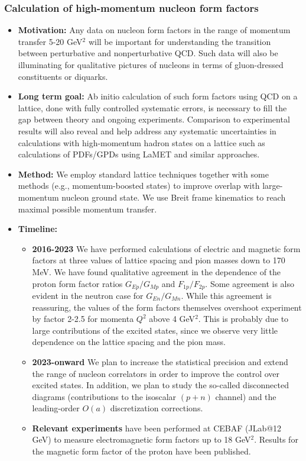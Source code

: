 \documentclass[12pt,hyperpdf]{article}
\begin{document}
\subsubsection{Calculation of high-momentum nucleon form factors}
\begin{itemize}
    \item{\bf Motivation:} Any data on nucleon form factors in the range of momentum transfer 5-20 GeV$^2$ will be important for understanding the transition between perturbative and nonperturbative QCD. Such data will also be illuminating for qualitative pictures of nucleons in terms of gluon-dressed constituents or diquarks.
    \item{\bf Long term goal:} Ab initio calculation of such form factors using QCD on a lattice, done with fully controlled systematic errors, is necessary to fill the gap between theory and ongoing experiments. Comparison to experimental results will also reveal and help address any systematic uncertainties in calculations with high-momentum hadron states on a lattice such as calculations of PDFs/GPDs using LaMET and similar approaches.
    \item{\bf Method:} We employ standard lattice techniques together with some methods (e.g., momentum-boosted states) to improve overlap with large-momentum nucleon ground state. We use Breit frame kinematics to reach maximal possible momentum transfer.
\item{\bf Timeline:}
\begin{itemize}
    \item{\bf 2016-2023} We have performed calculations of electric and magnetic form factors at three values of lattice spacing and pion masses down to 170 MeV. We have found qualitative agreement in the dependence of the proton form factor ratios $G_{Ep}/G_{Mp}$ and $F_{1p}/F_{2p}$. Some agreement is also evident in the neutron case for $G_{En}/G_{Mn}$. While this agreement is reassuring, the values of the form factors themselves overshoot experiment by factor 2-2.5 for momenta $Q^2$ above 4 GeV$^2$. This is probably due to large contributions of the excited states, since we observe very little dependence on the lattice spacing and the pion mass.
    \item{\bf 2023-onward} We plan to increase the statistical precision and extend the range of nucleon correlators in order to improve the control over excited states. In addition, we plan to study the so-called disconnected diagrams (contributions to the isoscalar $(p+n)$ channel) and the leading-order $O(a)$ discretization corrections.
    \item{\bf Relevant experiments} have been performed at CEBAF (JLab@12 GeV) to measure electromagnetic form factors up to 18 GeV$^2$. Results for the magnetic form factor of the proton have been published.
\end{itemize}
\end{itemize}
\end{document}
